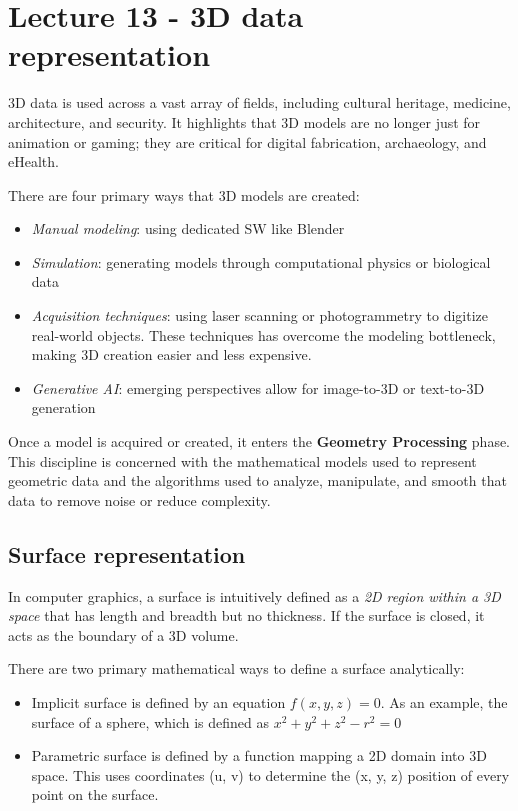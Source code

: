 \chapter{Lecture 13 - 3D data representation}

3D data is used across a vast array of fields, including cultural heritage, medicine, architecture, and security. It highlights that 3D models are no longer just for animation or gaming; they are critical for digital fabrication, archaeology, and eHealth. \par
There are four primary ways that 3D models are created:
\begin{itemize}[noitemsep]
    \item \textit{Manual modeling}: using dedicated SW like Blender
    \item \textit{Simulation}: generating models through computational physics or biological data
    \item \textit{Acquisition techniques}: using laser scanning or photogrammetry to digitize real-world objects. These techniques has overcome the modeling bottleneck, making 3D creation easier and less expensive.
    \item \textit{Generative AI}: emerging perspectives allow for image-to-3D or text-to-3D generation
\end{itemize}    

Once a model is acquired or created, it enters the \textbf{Geometry Processing} phase. This discipline is concerned with the mathematical models used to represent geometric data and the algorithms used to analyze, manipulate, and smooth that data to remove noise or reduce complexity.

\section{Surface representation}
\begin{definition}[Surface]
    In computer graphics, a surface is intuitively defined as a \emph{2D region within a 3D space} that has length and breadth but no thickness. If the surface is closed, it acts as the boundary of a 3D volume.
\end{definition}

There are two primary mathematical ways to define a surface analytically:
\begin{itemize}[noitemsep]
    \item Implicit surface is defined by an equation \(f(x, y, z) = 0\). As an example, the surface of a sphere, which is defined as \(x^2 + y^2 + z^2 - r^2 = 0\)
    \item Parametric surface is defined by a function mapping a 2D domain into 3D space. This uses coordinates (u, v) to determine the (x, y, z) position of every point on the surface.
\end{itemize}

